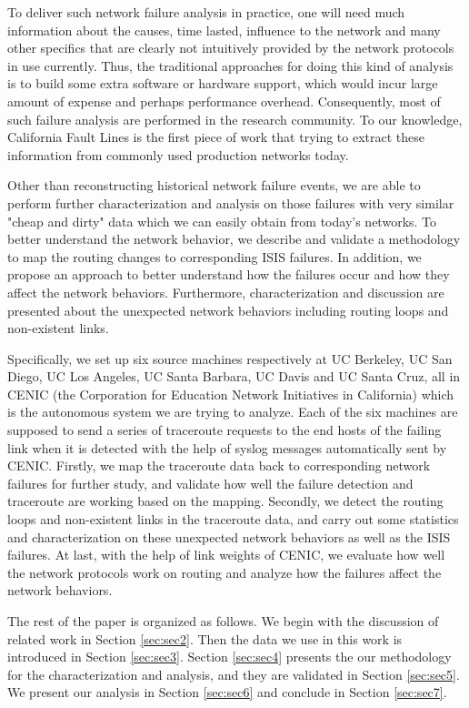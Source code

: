 \documentclass[conference, twocolumn, oneside, 10pt]{IEEEtran}
\begin{document}
To deliver such network failure analysis in practice, one will need much information about the causes, time lasted, influence to the network and many other specifics that are clearly not intuitively provided by the network protocols in use currently. Thus, the traditional approaches \cite{paxson1997end, cunha2011predicting} for doing this kind of analysis is to build some extra software or hardware support, which would incur large amount of expense and perhaps performance overhead. Consequently, most of such failure analysis are performed in the research community. To our knowledge, California Fault Lines \cite{turner2010california} is the first piece of work that trying to extract these information from commonly used production networks today.

Other than reconstructing historical network failure events, we are able to perform further characterization and analysis on those failures with very similar "cheap and dirty" data which we can easily obtain from today's networks. To better understand the network behavior, we describe and validate a methodology to map the routing changes to corresponding ISIS failures. In addition, we propose an approach to better understand how the failures occur and how they affect the network behaviors. Furthermore, characterization and discussion are presented about the unexpected network behaviors including routing loops and non-existent links.

Specifically, we set up six source machines respectively at UC Berkeley, UC San Diego, UC Los Angeles, UC Santa Barbara, UC Davis and UC Santa Cruz, all in CENIC (the Corporation for Education Network Initiatives in California) which is the autonomous system we are trying to analyze. Each of the six machines are supposed to send a series of traceroute requests to the end hosts of the failing link when it is detected with the help of syslog messages automatically sent by CENIC. Firstly, we map the traceroute data back to corresponding network failures for further study, and validate how well the failure detection and traceroute are working based on the mapping. Secondly, we detect the routing loops and non-existent links in the traceroute data, and carry out some statistics and characterization on these unexpected network behaviors as well as the ISIS failures. At last, with the help of link weights of CENIC, we evaluate how well the network protocols work on routing and analyze how the failures affect the network behaviors.

The rest of the paper is organized as follows. We begin with the discussion of related work in Section \ref{sec:sec2}. Then the data we use in this work is introduced in Section \ref{sec:sec3}. Section \ref{sec:sec4} presents the our methodology for the characterization and analysis, and they are validated in Section \ref{sec:sec5}. We present our analysis in Section \ref{sec:sec6} and conclude in Section \ref{sec:sec7}.
\end{document}
